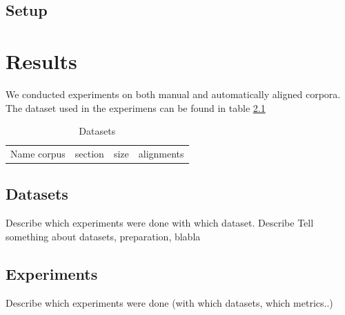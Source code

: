 \documentclass{report}
\theoremstyle{definition}
\theoremstyle{plain}
\begin{document}
\section{Setup}



\chapter{Results}


We conducted experiments on both manual and automatically aligned corpora. The dataset used in the experimens can be found in table \ref{table:datasets}

\begin{table}\label{table:datasets}
\begin{tabular}{cccc}
Name corpus & section & size & alignments\\
\end{tabular}
\caption{Datasets}
\end{table}

\section{Datasets}

Describe which experiments were done with which dataset. Describe
Tell something about datasets, preparation, blabla

\section{Experiments}

Describe which experiments were done (with which datasets, which metrics..)
\end{document}

